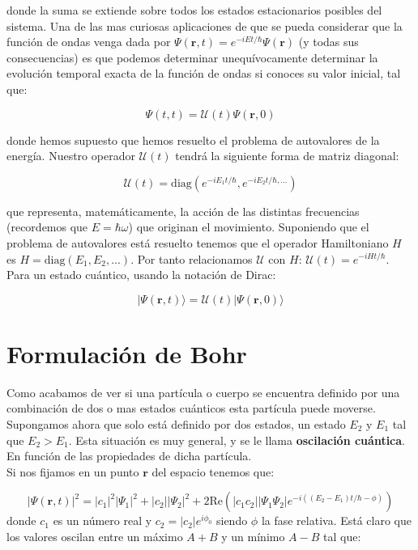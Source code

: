 \documentclass[12pt,a4paper]{article}
\numberwithin{equation}{section}
\numberwithin{figure}{section}
\newcommand{\parentesis}[1]{\left( #1  \right)}
\newcommand{\Real}{\mathrm{Re}}
\newcommand{\rn}{\mathbf{r}}
\begin{document}
donde la suma se extiende sobre todos los estados estacionarios posibles del sistema. Una de las mas curiosas aplicaciones de que se pueda considerar que la función de ondas venga dada por $\Psi (\rn,t) = e^{- i E t/\hbar} \Psi (\rn)$ (y todas sus consecuencias) es que podemos determinar unequívocamente determinar la evolución temporal exacta de la función de ondas si conoces su valor inicial, tal que:

\begin{equation}
\Psi (t,t) = \mathcal{U}(t)  \Psi (\rn,0)
\end{equation}

donde hemos supuesto que hemos resuelto el problema de autovalores de la energía. Nuestro operador $\mathcal{U}(t)$ tendrá la siguiente forma de matriz diagonal:

\begin{equation}
\mathcal{U}(t)  = \mathrm{diag} \parentesis{e^{-i E_1 t / \hbar}, e^{-i E_2 t / \hbar, ...}}
\end{equation}

que representa, matemáticamente, la acción de las distintas frecuencias (recordemos que $E = \hbar \omega$) que originan el movimiento. Suponiendo que el problema de autovalores está resuelto tenemos que el operador Hamiltoniano $H$ es $H = \mathrm{diag} \parentesis{E_1,E_2,...}$. Por tanto relacionamos $\mathcal{U}$ con $H$: $\mathcal{U}(t) = e^{-iHt/\hbar}$. Para un estado cuántico, usando la notación de Dirac:

\begin{equation}
| \Psi (\rn,t) \rangle = \mathcal{U} (t) | \Psi (\rn,0) \rangle
\end{equation}

\section{Formulación de Bohr}

Como acabamos de ver si una partícula o cuerpo se encuentra definido por una combinación de dos o mas estados cuánticos esta partícula puede moverse. Supongamos ahora que solo está definido por dos estados, un estado $E_2$ y $E_1$ tal que $E_2 > E_1$. Esta situación es muy general, y se le llama \textbf{oscilación cuántica}. En función de las propiedades de dicha partícula. \\

Si nos fijamos en un punto $\rn$ del espacio tenemos que:

\begin{equation}
|\Psi (\rn,t)|^2 = |c_1|^2 |\Psi_1|^2 + |c_2||\Psi_2|^2 + 2 \Real \parentesis{|c_1 c_2|  |\Psi_1 \Psi_2| e^{-i( (E_2 - E_1)t/\hbar -\phi)}}
\end{equation}
donde $c_1$ es un número real y $c_2 = |c_2| e^{i \phi_0}$ siendo $\phi$ la fase relativa. Está claro que los valores oscilan entre un máximo $A+B$ y un mínimo $A-B$ tal que:
\end{document}
